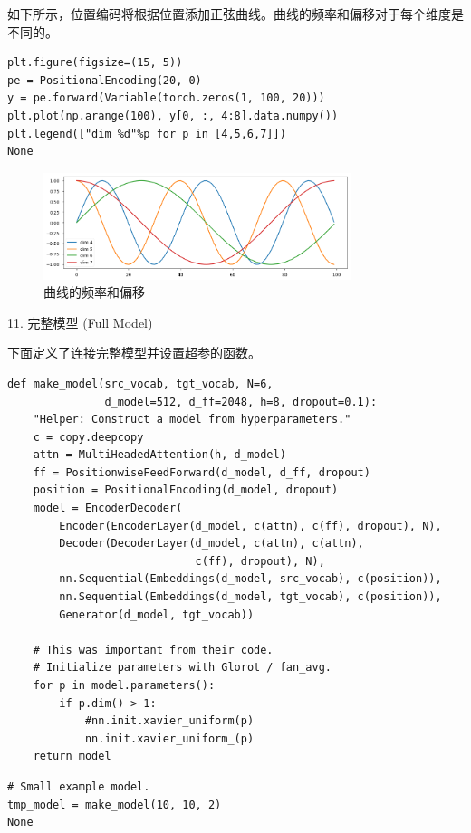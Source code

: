 如下所示，位置编码将根据位置添加正弦曲线。曲线的频率和偏移对于每个维度是不同的。

\begin{Verbatim}
plt.figure(figsize=(15, 5))
pe = PositionalEncoding(20, 0)
y = pe.forward(Variable(torch.zeros(1, 100, 20)))
plt.plot(np.arange(100), y[0, :, 4:8].data.numpy())
plt.legend(["dim %d"%p for p in [4,5,6,7]])
None
\end{Verbatim}

\begin{figure}[htb]
\centering 
\includegraphics[width=0.8\textwidth]{img/n5.png} 
\caption{曲线的频率和偏移}
\label{Test}
\end{figure}

11. 完整模型 (Full Model)

下面定义了连接完整模型并设置超参的函数。

\begin{Verbatim}
def make_model(src_vocab, tgt_vocab, N=6, 
               d_model=512, d_ff=2048, h=8, dropout=0.1):
    "Helper: Construct a model from hyperparameters."
    c = copy.deepcopy
    attn = MultiHeadedAttention(h, d_model)
    ff = PositionwiseFeedForward(d_model, d_ff, dropout)
    position = PositionalEncoding(d_model, dropout)
    model = EncoderDecoder(
        Encoder(EncoderLayer(d_model, c(attn), c(ff), dropout), N),
        Decoder(DecoderLayer(d_model, c(attn), c(attn), 
                             c(ff), dropout), N),
        nn.Sequential(Embeddings(d_model, src_vocab), c(position)),
        nn.Sequential(Embeddings(d_model, tgt_vocab), c(position)),
        Generator(d_model, tgt_vocab))
    
    # This was important from their code. 
    # Initialize parameters with Glorot / fan_avg.
    for p in model.parameters():
        if p.dim() > 1:
            #nn.init.xavier_uniform(p)
            nn.init.xavier_uniform_(p)
    return model
\end{Verbatim}

\begin{Verbatim}
# Small example model.
tmp_model = make_model(10, 10, 2)
None
\end{Verbatim}

